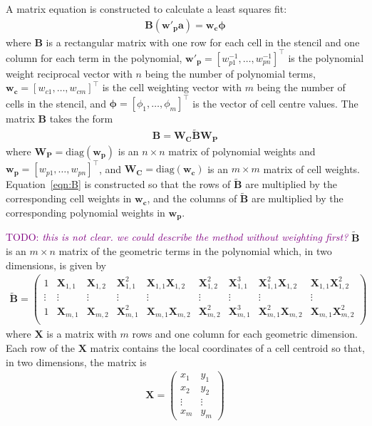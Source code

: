 \documentclass{article}
\newcommand{\TODO}[1]{\textcolor{purple}{TODO: \emph{#1}}}
\begin{document}
A matrix equation is constructed to calculate a least squares fit:
\begin{align}
	\mathbf{B} \left(\mathbf{w'_p} \mathbf{a}\right) = \mathbf{w_c} \bm{\phi}
\end{align}
where $\mathbf{B}$ is a rectangular matrix with one row for each cell in the stencil and one column for each term in the polynomial, $\mathbf{w'_p} = [w_{p1}^{-1}, \ldots, w_{pn}^{-1}]^\intercal$ is the polynomial weight reciprocal vector with $n$ being the number of polynomial terms,  $\mathbf{w_c} = [w_{c1}, \ldots, w_{cm}]^\intercal$ is the cell weighting vector with $m$ being the number of cells in the stencil, and $\bm{\phi} = [\phi_1, \ldots, \phi_m]^\intercal$ is the vector of cell centre values.
The matrix $\mathbf{B}$ takes the form
\begin{align}
	\mathbf{B} = \mathbf{W_C} \mathbf{\tilde{B}} \mathbf{W_P} \label{eqn:B}
\end{align}
where $\mathbf{W_P} = \mathrm{diag}(\mathbf{w_p})$ is an $n \times n$ matrix of polynomial weights and $\mathbf{w_p} = [w_{p1}, \ldots, w_{pn}]^\intercal$, and $\mathbf{W_C} = \mathrm{diag}(\mathbf{w_c})$ is an $m \times m$ matrix of cell weights.  Equation~\ref{eqn:B} is constructed so that the rows of $\mathbf{\tilde{B}}$ are multiplied by the corresponding cell weights in $\mathbf{w_c}$, and the columns of $\mathbf{\tilde{B}}$ are multiplied by the corresponding polynomial weights in $\mathbf{w_p}$.

\TODO{this is not clear.  we could describe the method without weighting first?}
$\mathbf{\tilde{B}}$ is an $m \times n$ matrix of the geometric terms in the polynomial which, in two dimensions, is given by
\begin{align}
	\mathbf{\tilde{B}} = 
	\begin{pmatrix}
		1 & \mathbf{X}_{1,1} & \mathbf{X}_{1,2} & \mathbf{X}_{1,1}^2 & \mathbf{X}_{1,1} \mathbf{X}_{1,2} & \mathbf{X}_{1,2}^2 & \mathbf{X}_{1,1}^3 & \mathbf{X}_{1,1}^2 \mathbf{X}_{1,2} & \mathbf{X}_{1,1} \mathbf{X}_{1,2}^2 \\
		\vdots & \vdots & \vdots & \vdots & \vdots & \vdots & \vdots & \vdots & \vdots \\
		1 & \mathbf{X}_{m,1} & \mathbf{X}_{m,2} & \mathbf{X}_{m,1}^2 & \mathbf{X}_{m,1} \mathbf{X}_{m,2} & \mathbf{X}_{m,2}^2 & \mathbf{X}_{m,1}^3 & \mathbf{X}_{m,1}^2 \mathbf{X}_{m,2} & \mathbf{X}_{m,1} \mathbf{X}_{m,2}^2 \\
	\end{pmatrix}
\end{align}
where $\mathbf{X}$ is a matrix with $m$ rows and one column for each geometric dimension.  
Each row of the $\mathbf{X}$ matrix contains the local coordinates of a cell centroid so that, in two dimensions, the matrix is
\begin{align}
	\mathbf{X} = 
	\begin{pmatrix}
		x_1 & y_1 \\
		x_2 & y_2 \\
		\vdots & \vdots \\
		x_m & y_m
	\end{pmatrix}
\end{align}
\end{document}
